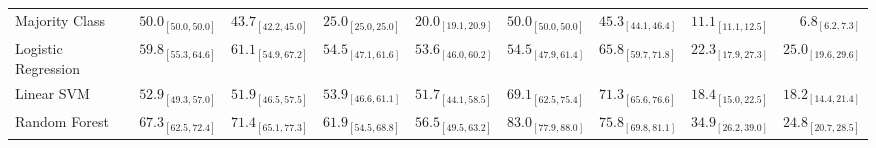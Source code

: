 \begin{tabular}{lrrrrrrrr}
Majority Class & $50.0_{[50.0,50.0]}$ & $43.7_{[42.2,45.0]}$ & $25.0_{[25.0,25.0]}$ & $20.0_{[19.1,20.9]}$ & $50.0_{[50.0,50.0]}$ & $45.3_{[44.1,46.4]}$ & $11.1_{[11.1,12.5]}$ & $6.8_{[6.2,7.3]}$ \\
Logistic Regression & $59.8_{[55.3,64.6]}$ & $61.1_{[54.9,67.2]}$ & $54.5_{[47.1,61.6]}$ & $53.6_{[46.0,60.2]}$ & $54.5_{[47.9,61.4]}$ & $65.8_{[59.7,71.8]}$ & $22.3_{[17.9,27.3]}$ & $25.0_{[19.6,29.6]}$ \\
Linear SVM & $52.9_{[49.3,57.0]}$ & $51.9_{[46.5,57.5]}$ & $53.9_{[46.6,61.1]}$ & $51.7_{[44.1,58.5]}$ & $69.1_{[62.5,75.4]}$ & $71.3_{[65.6,76.6]}$ & $18.4_{[15.0,22.5]}$ & $18.2_{[14.4,21.4]}$ \\
Random Forest & $67.3_{[62.5,72.4]}$ & $71.4_{[65.1,77.3]}$ & $61.9_{[54.5,68.8]}$ & $56.5_{[49.5,63.2]}$ & $\mathbf{83.0}_{[77.9,88.0]}$ & $75.8_{[69.8,81.1]}$ & $34.9_{[26.2,39.0]}$ & $24.8_{[20.7,28.5]}$ \\
\bottomrule
\end{tabular}
